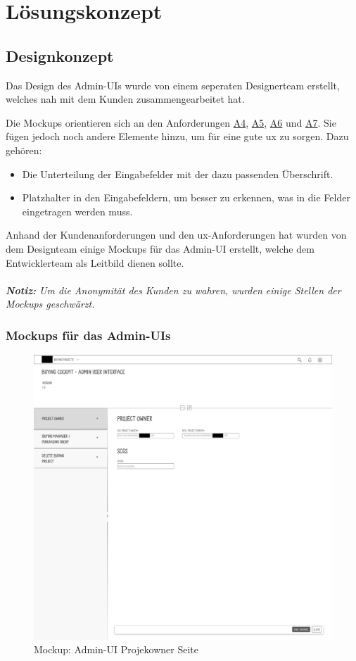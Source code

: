 \newpage
\section{Lösungskonzept}
\subsection[Designkonzept]{Designkonzept}
Das Design des Admin-UIs wurde von einem seperaten Designerteam erstellt, welches nah mit dem Kunden zusammengearbeitet hat.

Die Mockups orientieren sich an den Anforderungen \hyperref[Tab:A4]{A4}, \hyperref[Tab:A5]{A5}, \hyperref[Tab:A6]{A6} und \hyperref[Tab:A7]{A7}.
Sie fügen jedoch noch andere Elemente hinzu, um für eine gute \gls{ux} zu sorgen. Dazu gehören:
\begin{itemize}
    \item Die Unterteilung der Eingabefelder mit der dazu passenden Überschrift.
    \item Platzhalter in den Eingabefeldern, um besser zu erkennen, was in die Felder eingetragen werden muss.
\end{itemize}

Anhand der Kundenanforderungen und den \gls{ux}-Anforderungen hat wurden von dem Designteam einige Mockups für das Admin-UI erstellt, welche dem Entwicklerteam als Leitbild dienen sollte. \\\\
\textit{\textbf{Notiz:} Um die Anonymität des Kunden zu wahren, wurden einige Stellen der Mockups geschwärzt.}

\subsubsection[short]{Mockups für das Admin-UIs}
\begin{figure}[H]
    \centering
    \includegraphics[width=\linewidth]{Images/Mockup_PO_anonym.png}
    \caption[Mockup: Admin-UI Projekowner Seite]{Mockup: Admin-UI Projekowner Seite}
\end{figure}

